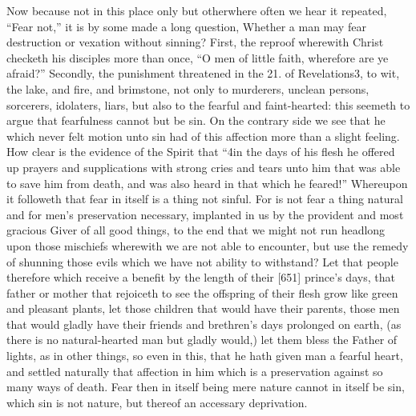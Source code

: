 Now because not in this place only but otherwhere often we hear it repeated, “Fear not,” it is by some made a long question, Whether a man may fear destruction or vexation without sinning? First, the reproof wherewith Christ checketh his disciples more than once, “O men of little faith, wherefore are ye afraid?” Secondly, the punishment threatened in the 21. of Revelations3, to wit, the lake, and fire, and brimstone, not only to murderers, unclean persons, sorcerers, idolaters, liars, but also to the fearful and faint-hearted: this seemeth to argue that fearfulness cannot but be sin. On the contrary side we see that he which never felt motion unto sin had of this affection more than a slight feeling. How clear is the evidence of the Spirit that “4in the days of his flesh he offered up prayers and supplications with strong cries and tears unto him that was able to save him from death, and was also heard in that which he feared!” Whereupon it followeth that fear in itself is a thing not sinful. For is not fear a thing natural and for men’s preservation necessary, implanted in us by the provident and most gracious Giver of all good things, to the end that we might not run headlong upon those mischiefs wherewith we are not able to encounter, but use the remedy of shunning those evils which we have not ability to withstand? Let that people therefore which receive a benefit by the length of their [651] prince’s days, that father or mother that rejoiceth to see the offspring of their flesh grow like green and pleasant plants, let those children that would have their parents, those men that would gladly have their friends and brethren’s days prolonged on earth, (as there is no natural-hearted man but gladly would,) let them bless the Father of lights, as in other things, so even in this, that he hath given man a fearful heart, and settled naturally that affection in him which is a preservation against so many ways of death. Fear then in itself being mere nature cannot in itself be sin, which sin is not nature, but thereof an accessary deprivation.

